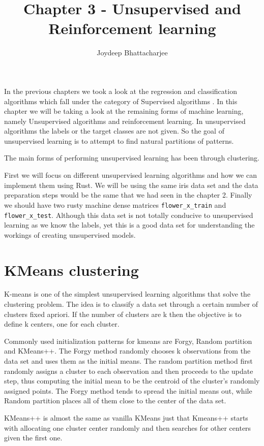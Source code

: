 \documentclass{book}
\title{Chapter 3 - Unsupervised and Reinforcement learning}
\author{Joydeep Bhattacharjee}
\begin{document}
\maketitle

In the previous chapters we took a look at the regression and classification algorithms which fall under the category of Supervised algorithms\cite{UL:1} . In this chapter we will be taking a look at the remaining forms of machine learning, namely Unsupervised algorithms and reinforcement learning. In unsupervised algorithms the labels or the target classes are not given. So the goal of unsupervised learning is to attempt to find natural partitions of patterns. 

The main forms of performing unsupervised learning has been through clustering.

First we will focus on different unsupervised learning algorithms and how we can implement them using Rust. We will be using the same iris data set and the data preparation steps would be the same that we had seen in the chapter 2. Finally we should have two rusty machine dense matrices \lstinline{flower_x_train} and \lstinline{flower_x_test}. Although this data set is not totally conducive to unsupervised learning as we know the labels, yet this is a good data set for understanding the workings of creating unsupervised models.

\section{KMeans clustering}%
K-means is one of the simplest unsupervised learning algorithms that solve the clustering problem. The idea is to classify a data set through a certain number of clusters fixed apriori. If the number of clusters are k then the objective is to define k centers, one for each cluster. 

Commonly used initialization patterns for kmeans are Forgy, Random partition and KMeans++. The Forgy method randomly chooses k observations from the data set and uses them as the initial means. The random partition method first randomly assigns a cluster to each observation and then proceeds to the update step, thus computing the initial mean to be the centroid of the cluster's randomly assigned points. The Forgy method tends to spread the initial means out, while Random partition places all of them close to the center of the data set.

KMeans++ is almost the same as vanilla KMeans just that Kmeans++ starts with allocating one cluster center randomly and then searches for other centers given the first one\cite{UL:10}.
\end{document}

